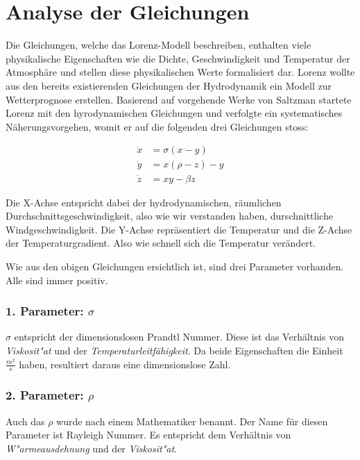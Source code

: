 
\section{Analyse der Gleichungen}
Die Gleichungen, welche das Lorenz-Modell beschreiben, enthalten viele physikalische Eigenschaften wie die Dichte, Geschwindigkeit und Temperatur der Atmosphäre und stellen diese physikalischen Werte formalisiert dar. Lorenz wollte aus den bereits existierenden Gleichungen der Hydrodynamik ein Modell zur Wetterprognose erstellen. Basierend auf vorgehende Werke von Saltzman startete Lorenz mit den hyrodynamischen Gleichungen und verfolgte ein systematisches Näherungsvorgehen, womit er auf die folgenden drei Gleichungen stoss:

\begin{centerFigure}
	\begin{align}
	\dot{x} &= \sigma(x - y)\\
	\dot{y} &= x(\rho - z) - y\\
	\dot{z} &= xy - \beta z
	\end{align}
\end{centerFigure}

Die X-Achse entspricht dabei der hydrodynamischen, räumlichen Durchschnittsgeschwindigkeit, also wie wir verstanden haben, durschnittliche Windgeschwindigkeit. 
Die Y-Achse repräsentiert die Temperatur und die Z-Achse der Temperaturgradient. Also wie schnell sich die Temperatur verändert. 

Wie aus den obigen Gleichungen ersichtlich ist, sind drei Parameter vorhanden. Alle sind immer positiv.

\subsubsection{1. Parameter: $\sigma$}
$\sigma$ entspricht der dimensionslosen Prandtl Nummer. Diese ist das Verhältnis von \textit{Viskosit"at} und der \textit{Temperaturleitfähigkeit}. Da beide Eigenschaften die Einheit $\frac{m^2}{s}$ haben, resultiert daraus eine dimensionslose Zahl.

\subsubsection{2. Parameter: $\rho$}
Auch das $\rho$ wurde nach einem Mathematiker benannt. Der Name für diesen Parameter ist Rayleigh Nummer. Es entspricht dem Verhältnis von \textit{W"armeausdehnung} und der \textit{Viskosit"at}.

